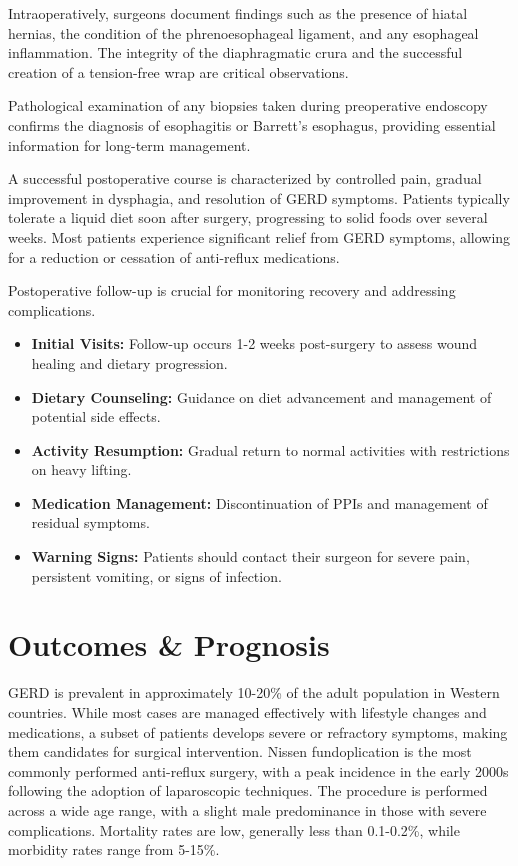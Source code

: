 Intraoperatively, surgeons document findings such as the presence of hiatal hernias, the condition of the phrenoesophageal ligament, and any esophageal inflammation. The integrity of the diaphragmatic crura and the successful creation of a tension-free wrap are critical observations. 

Pathological examination of any biopsies taken during preoperative endoscopy confirms the diagnosis of esophagitis or Barrett's esophagus, providing essential information for long-term management.

A successful postoperative course is characterized by controlled pain, gradual improvement in dysphagia, and resolution of GERD symptoms. Patients typically tolerate a liquid diet soon after surgery, progressing to solid foods over several weeks. Most patients experience significant relief from GERD symptoms, allowing for a reduction or cessation of anti-reflux medications.

Postoperative follow-up is crucial for monitoring recovery and addressing complications. 

\begin{itemize}
  \item \textbf{Initial Visits:} Follow-up occurs 1-2 weeks post-surgery to assess wound healing and dietary progression.
  \item \textbf{Dietary Counseling:} Guidance on diet advancement and management of potential side effects.
  \item \textbf{Activity Resumption:} Gradual return to normal activities with restrictions on heavy lifting.
  \item \textbf{Medication Management:} Discontinuation of PPIs and management of residual symptoms.
  \item \textbf{Warning Signs:} Patients should contact their surgeon for severe pain, persistent vomiting, or signs of infection.
\end{itemize}

\section*{Outcomes \& Prognosis}
GERD is prevalent in approximately 10-20\% of the adult population in Western countries. While most cases are managed effectively with lifestyle changes and medications, a subset of patients develops severe or refractory symptoms, making them candidates for surgical intervention. Nissen fundoplication is the most commonly performed anti-reflux surgery, with a peak incidence in the early 2000s following the adoption of laparoscopic techniques. The procedure is performed across a wide age range, with a slight male predominance in those with severe complications. Mortality rates are low, generally less than 0.1-0.2\%, while morbidity rates range from 5-15\%.

